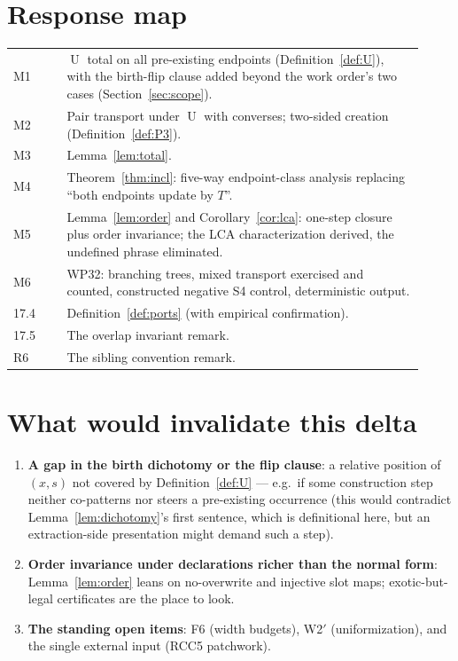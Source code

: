 \documentclass[11pt]{article}
\theoremstyle{definition}
\newcommand{\U}{\operatorname{U}}
\begin{document}
\section{Response map}\label{sec:resp}

\begin{center}
\begin{tabular}{p{0.12\linewidth}p{0.80\linewidth}}
\toprule
M1 & $\U$ total on all pre-existing endpoints
(Definition~\ref{def:U}), with the birth-flip clause added beyond the
work order's two cases (Section~\ref{sec:scope}).\\
M2 & Pair transport under $\U$ with converses; two-sided creation
(Definition~\ref{def:P3}).\\
M3 & Lemma~\ref{lem:total}.\\
M4 & Theorem~\ref{thm:incl}: five-way endpoint-class analysis replacing
``both endpoints update by $T$''.\\
M5 & Lemma~\ref{lem:order} and Corollary~\ref{cor:lca}: one-step
closure plus order invariance; the LCA characterization derived, the
undefined phrase eliminated.\\
M6 & WP32: branching trees, mixed transport exercised and counted,
constructed negative S4 control, deterministic output.\\
17.4 & Definition~\ref{def:ports} (with empirical confirmation).\\
17.5 & The overlap invariant remark.\\
R6 & The sibling convention remark.\\
\bottomrule
\end{tabular}
\end{center}

\section{What would invalidate this delta}\label{sec:invalidate}

\begin{enumerate}[label=(Z\arabic*),leftmargin=2.6em]
\item \textbf{A gap in the birth dichotomy or the flip clause}: a
relative position of $(x,s)$ not covered by
Definition~\ref{def:U} --- e.g.\ if some construction step neither
co-patterns nor steers a pre-existing occurrence (this would contradict
Lemma~\ref{lem:dichotomy}'s first sentence, which is definitional here,
but an extraction-side presentation might demand such a step).
\item \textbf{Order invariance under declarations richer than the
normal form}: Lemma~\ref{lem:order} leans on no-overwrite and
injective slot maps; exotic-but-legal certificates are the place to
look.
\item \textbf{The standing open items}: F6 (width budgets), W2$'$
(uniformization), and the single external input (RCC5 patchwork).
\end{enumerate}
\end{document}
